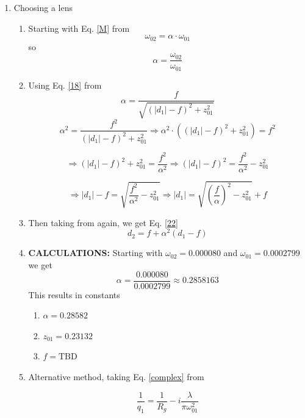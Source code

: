 \documentclass[11pt, letterpaper]{article}
\begin{document}
\begin{enumerate}
\begin{enumerate}
    
    \item Because the beam waist $\omega_{01} \approx 280~\mu\text{m}$ is the thinnest portion of the laser, the beam will only diverge and "scrape" the inside of the crystal. Therefore we need a focusing lens.


\end{enumerate}
\item Choosing a lens
\begin{enumerate}
\item Starting with Eq. \ref{M} from \cite{edmund}
\begin{equation}\label{M}
    \omega_{02}=\alpha\cdot\omega_{01}
\end{equation}
so $$\alpha=\frac{\omega_{02}}{\omega_{01}}$$
    \item Using Eq. \ref{18} from \cite{edmund} 
    \begin{equation}\label{18}
        \alpha = \frac{f}{\sqrt{(|d_1| - f)^2 + z_{01}^2}}
    \end{equation}
$$\alpha^2 = \frac{f^2}{(|d_1| - f)^2 + z_{01}^2}\Rightarrow \alpha^2 \cdot\left((|d_1| - f)^2 + z_{01}^2\right)= f^2$$

$$\Rightarrow(|d_1| - f)^2 + z_{01}^2= \frac{f^2}{\alpha^2}\Rightarrow (|d_1| - f)^2= \frac{f^2}{\alpha^2}-z_{01}^2$$

$$\Rightarrow |d_1| - f= \sqrt{\frac{f^2}{\alpha^2}-z_{01}^2}\Rightarrow |d_1|= \sqrt{\left(\frac{f}{\alpha}\right)^2-z_{01}^2}+f$$

\item Then taking from \cite{edmund} again, we get Eq. \ref{22}
\begin{equation}\label{22}
    d_2 = f + \alpha^2(d_1 - f)
\end{equation}   
\item \textbf{CALCULATIONS: }Starting with $\omega_{02}=0.000080$ and $\omega_{01}=0.0002799$ we get $$\alpha=\frac{0.000080}{0.0002799}\approx0.2858163$$ This results in constants 
\begin{enumerate}
    \item $\alpha=0.28582$
    \item $z_{01}=0.23132$
    \item $f=\text{TBD}$
\end{enumerate}
\item Alternative method, taking Eq. \ref{complex} from \cite{Osche}

\begin{equation}\label{complex}
    \frac{1}{q_1} = \frac{1}{R_{g}} - i\frac{\lambda}{\pi \omega_{01}^2}
\end{equation}


\end{enumerate}
\end{enumerate}
\end{document}

